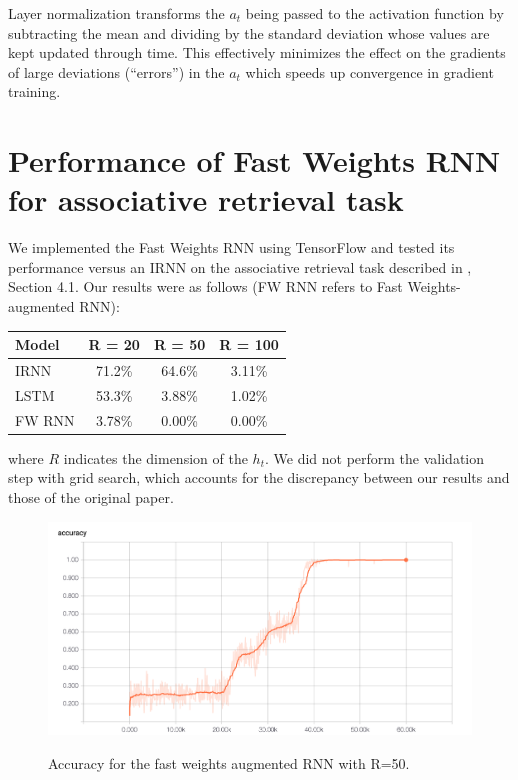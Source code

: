 Layer normalization \cite{DBLP:journals/corr/BaKH16} transforms the $a_t$ being passed to the activation function by subtracting the mean and dividing by the standard deviation whose values are kept updated through time. This effectively minimizes the effect on the gradients of large deviations (``errors'') in the $a_t$ which speeds up convergence in gradient training.

\section{Performance of Fast Weights RNN for associative retrieval task}
\label{sec:assoc_retrieval_task_performance}

We implemented the Fast Weights RNN using TensorFlow \cite{abadi2016tensorflow} and tested its performance versus an IRNN on the associative retrieval task described in \citealt{DBLP:conf/nips/BaHMLI16}, Section 4.1. Our results were as follows (FW RNN refers to Fast Weights-augmented RNN):

\begin{center}
  \begin{tabular}{lccc}
    Model & R = 20 & R = 50 & R = 100 \\
    \hline
    IRNN & 71.2\% & 64.6\% & 3.11\% \\
    LSTM & 53.3\% & 3.88\% & 1.02\% \\
    FW RNN & 3.78\% & 0.00\% & 0.00\%
  \end{tabular}
\end{center}
%
where $R$ indicates the dimension of the $h_t$. We did not perform the validation step with grid search, which accounts for the discrepancy between our results and those of the original paper.

\begin{figure}
  \centering
  \includegraphics[scale=0.30]{../final/images/fast_weight_r_50_accuracy.png} \\
  \caption{Accuracy for the fast weights augmented RNN with R=50.}
\end{figure}
